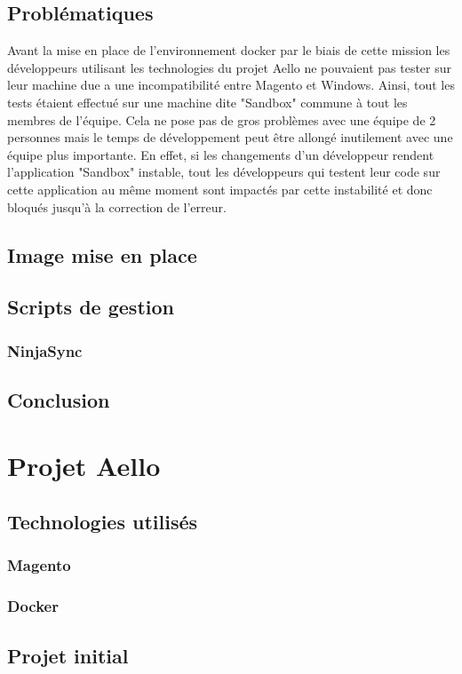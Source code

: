 \documentclass{Article}
\begin{document}
	\subsection{Problématiques}

	Avant la mise en place de l'environnement docker par le biais de cette mission les développeurs utilisant les technologies du projet Aello ne pouvaient pas tester sur leur machine due a une incompatibilité entre Magento et Windows. Ainsi, tout les tests étaient effectué sur une machine dite "Sandbox" commune à tout les membres de l'équipe. Cela ne pose pas de gros problèmes avec une équipe de 2 personnes mais le temps de développement peut être allongé inutilement avec une équipe plus importante. En effet, si les changements d'un développeur rendent l'application "Sandbox" instable, tout les développeurs qui testent leur code sur cette application au même moment sont impactés par cette instabilité et donc bloqués jusqu’à la correction de l’erreur.

	\subsection{Image mise en place}
	\subsection{Scripts de gestion}
		\subsubsection{NinjaSync}
	\subsection{Conclusion}
\section{Projet Aello}
	\subsection{Technologies utilisés}
		\subsubsection{Magento}
		\subsubsection{Docker}
	\subsection{Projet initial}
\end{document}
